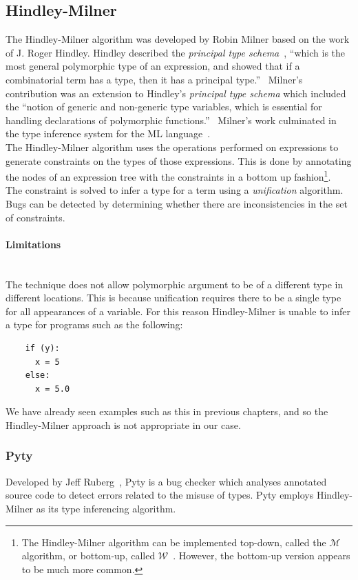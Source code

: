 \documentclass[12pt, titlepage]{article}
\begin{document}
\subsection{Hindley-Milner}
The Hindley-Milner algorithm was developed by Robin Milner based on the work of J. Roger Hindley. Hindley described the \textit{principal
type schema}~\cite{hindley69}, ``which is the most general polymorphic type of an expression, and showed that if a combinatorial term has a type, then it has a principal type.''~\cite{cardelli87} Milner's contribution was an extension to Hindley's \textit{principal type schema} which included the ``notion of generic and non-generic type variables, which is essential for handling declarations of polymorphic functions.''~\cite{cardelli87} Milner's work culminated in the type inference system for the ML language~\cite{milner84}. \\
The Hindley-Milner algorithm uses the operations performed on expressions to generate constraints on the types of those expressions. This is done by annotating the nodes of an expression tree with the constraints in a bottom up fashion\footnote{The Hindley-Milner algorithm can be implemented top-down, called the $\mathcal{M}$ algorithm, or bottom-up, called $\mathcal{W}$~\cite{heeren02}. However, the bottom-up version appears to be much more common.}. \\ The constraint is solved to infer a type for a term using a \textit{unification} algorithm.
Bugs can be detected by determining whether there are inconsistencies in the set of constraints.

\paragraph{Limitations}\mbox{}\\
The technique does not allow polymorphic argument to be of a different type in different locations. This is because unification requires there to be a single type for all appearances of a variable. For this reason Hindley-Milner is unable to infer a type for programs such as the following:
\begin{lstlisting}
	if (y):	
	  x = 5     
	else:
	  x = 5.0   
\end{lstlisting}
We have already seen examples such as this in previous chapters, and so the Hindley-Milner approach is not appropriate in our case.

\subsubsection{Pyty}
Developed by Jeff Ruberg~\cite{pyty}, Pyty is a bug checker which analyses annotated source code to detect errors related to the misuse of types. Pyty employs Hindley-Milner as its type inferencing algorithm.
\end{document}

